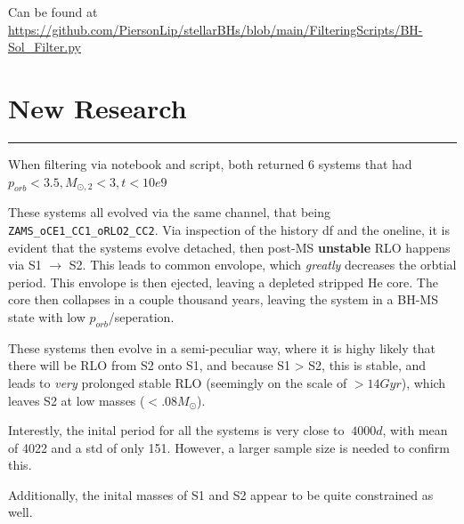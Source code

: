 \documentclass{article}
\theoremstyle{mytheoremstyle}
\theoremstyle{mytheoremstyle}
\theoremstyle{myproblemstyle}
\theoremstyle{myproblemstyle}
\newcounter{const}
\begin{document}
Can be found at \url{https://github.com/PiersonLip/stellarBHs/blob/main/FilteringScripts/BH-Sol_Filter.py}

\pagebreak
\section{New Research}
\hrule
\vspace{.5cm}
When filtering via notebook and script, both returned 6 systems that had \(p_{orb} < 3.5, M_{\odot,2} < 3, t < 10e9\)

These systems all evolved via the same channel, that being \verb|ZAMS_oCE1_CC1_oRLO2_CC2|. Via inspection of the history df and the oneline, it is evident that the systems evolve detached, then post-MS \textbf{unstable} RLO happens via S1 \(\rightarrow\) S2. This leads to common envolope, which \textit{greatly} decreases the orbtial period. This envolope is then ejected, leaving a depleted stripped He core. The core then collapses in a couple thousand years, leaving the system in a BH-MS state with low \(p_{orb}\)/seperation. 

These systems then evolve in a semi-peculiar way, where it is highy likely that there will be RLO from S2 onto S1, and because S1 > S2, this is stable, and leads to \textit{very} prolonged stable RLO (seemingly on the scale of  \(> 14 Gyr\)), which leaves S2 at low masses (\(< .08 M_\odot\)).

Interestly, the inital period for all the systems is very close to \(~4000 d\), with mean of 4022 and a std of only 151. However, a larger sample size is needed to confirm this.

Additionally, the inital masses of S1 and S2 appear to be quite constrained as well. 
\end{document}
